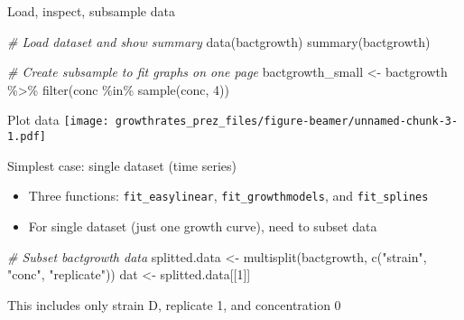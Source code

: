 \documentclass[
  ignorenonframetext,
]{beamer}
\newenvironment{Shaded}{\begin{snugshade}}{\end{snugshade}}
\newcommand{\CommentTok}[1]{\textcolor[rgb]{0.56,0.35,0.01}{\textit{#1}}}
\newcommand{\DecValTok}[1]{\textcolor[rgb]{0.00,0.00,0.81}{#1}}
\newcommand{\FunctionTok}[1]{\textcolor[rgb]{0.00,0.00,0.00}{#1}}
\newcommand{\NormalTok}[1]{#1}
\newcommand{\OtherTok}[1]{\textcolor[rgb]{0.56,0.35,0.01}{#1}}
\newcommand{\SpecialCharTok}[1]{\textcolor[rgb]{0.00,0.00,0.00}{#1}}
\newcommand{\StringTok}[1]{\textcolor[rgb]{0.31,0.60,0.02}{#1}}
\providecommand{\tightlist}{%
  \setlength{\itemsep}{0pt}\setlength{\parskip}{0pt}}
\begin{document}
\begin{frame}[fragile]{Load, inspect, subsample data}
\protect\hypertarget{load-inspect-subsample-data}{}
\begin{Shaded}
\begin{Highlighting}[]
\CommentTok{\# Load dataset and show summary}
\FunctionTok{data}\NormalTok{(bactgrowth)}
\FunctionTok{summary}\NormalTok{(bactgrowth)}

\CommentTok{\# Create subsample to fit graphs on one page}
\NormalTok{bactgrowth\_small }\OtherTok{\textless{}{-}}\NormalTok{ bactgrowth }\SpecialCharTok{\%\textgreater{}\%}
  \FunctionTok{filter}\NormalTok{(conc }\SpecialCharTok{\%in\%} \FunctionTok{sample}\NormalTok{(conc, }\DecValTok{4}\NormalTok{))}
\end{Highlighting}
\end{Shaded}
\end{frame}

\begin{frame}{Plot data}
\protect\hypertarget{plot-data}{}
\texttt{[image: growthrates\_prez\_files/figure-beamer/unnamed-chunk-3-1.pdf]}
\end{frame}

\begin{frame}[fragile]{Simplest case: single dataset (time series)}
\protect\hypertarget{simplest-case-single-dataset-time-series}{}
\begin{itemize}
\tightlist
\item
  Three functions: \texttt{fit\_easylinear}, \texttt{fit\_growthmodels},
  and \texttt{fit\_splines}
\item
  For single dataset (just one growth curve), need to subset data
\end{itemize}

\begin{Shaded}
\begin{Highlighting}[]
\CommentTok{\# Subset bactgrowth data}
\NormalTok{splitted.data }\OtherTok{\textless{}{-}} \FunctionTok{multisplit}\NormalTok{(bactgrowth, }
                            \FunctionTok{c}\NormalTok{(}\StringTok{"strain"}\NormalTok{, }\StringTok{"conc"}\NormalTok{, }\StringTok{"replicate"}\NormalTok{))}
\NormalTok{dat }\OtherTok{\textless{}{-}}\NormalTok{ splitted.data[[}\DecValTok{1}\NormalTok{]]}
\end{Highlighting}
\end{Shaded}

This includes only strain D, replicate 1, and concentration 0
\end{frame}
\end{document}
